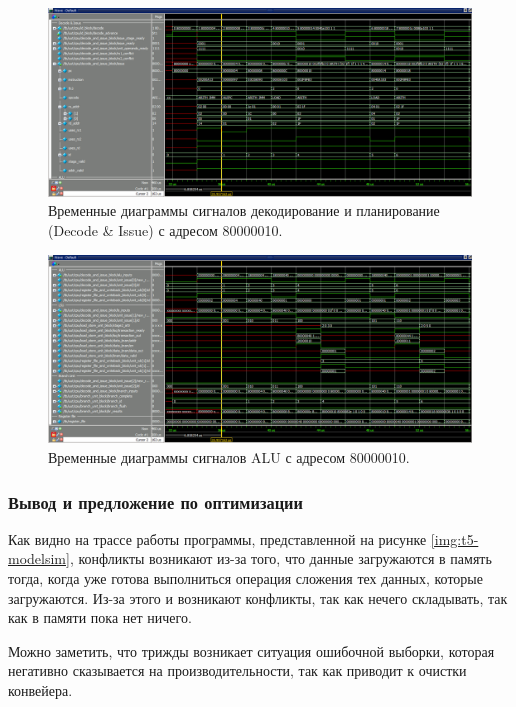 \begin{figure}[h]
	\centering
	\includegraphics[height=0.3\textheight]{img/t5-decode}
	\caption{Временные диаграммы сигналов декодирование и планирование (Decode \& Issue) с адресом 80000010.}
	\label{img:t5-decode}
\end{figure}

\begin{figure}[h]
	\centering
	\includegraphics[height=0.3\textheight]{img/t5-alu}
	\caption{Временные диаграммы сигналов ALU с адресом 80000010.}
	\label{img:t5-alu}
\end{figure}

\subsubsection*{Вывод и предложение по оптимизации}
Как видно на трассе работы программы, представленной на рисунке \ref{img:t5-modelsim}, конфликты возникают из-за того, что данные загружаются в память тогда, когда уже готова выполниться операция сложения тех данных, которые загружаются. Из-за этого и возникают конфликты, так как нечего складывать, так как в памяти пока нет ничего. 

Можно заметить, что трижды возникает ситуация ошибочной выборки, которая негативно сказывается на производительности, так как приводит к очистки конвейера.

